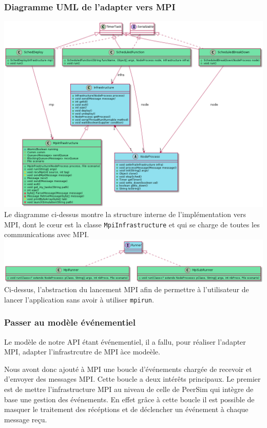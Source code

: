 \documentclass{article}
\begin{document}
				\subsubsection{Diagramme UML de l'adapter vers MPI}
				\vspace{1mm}
				\hspace*{-2.1cm} \includegraphics[width=19.5cm]{uml/mpi1.png}
				Le diagramme ci-dessus montre la structure interne de l'implémentation vers MPI, dont le cœur est la classe \verb|MpiInfrastructure|
				et qui se charge de toutes les communications avec MPI.
				\newpage
				\hspace*{-2.3cm} \includegraphics[width=20cm]{uml/mpi2.png}
				Ci-dessus, l'abstraction du lancement MPI afin de permettre à l'utilisateur de lancer l'application sans avoir à utiliser \verb|mpirun|.

				\subsubsection{Passer au modèle événementiel}
				Le modèle de notre API étant événementiel, il a fallu, pour réaliser l'adapter MPI,
				adapter l'infrastrcutre de MPI àce modeèle.

				Nous avont donc ajouté à MPI une boucle d'événements chargée de recevoir et
				d'envoyer des messages MPI. Cette boucle a deux intérêts principaux.
				Le premier est de mettre l'infrastructure MPI au niveau de celle de PeerSim qui
				intègre de base une gestion des événements. En effet grâce à cette boucle il est
				possible de masquer le traitement des récéptions et de déclencher un événement à
				chaque message reçu.
\end{document}
